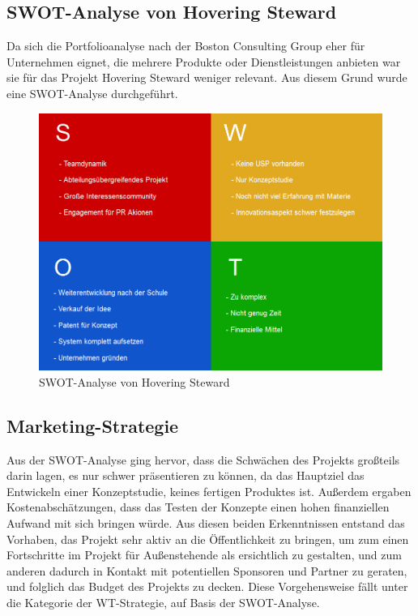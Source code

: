     \subsection*{SWOT-Analyse von Hovering Steward}
    Da sich die Portfolioanalyse nach der Boston Consulting Group eher für Unternehmen eignet, die mehrere Produkte oder Dienstleistungen anbieten war sie für das Projekt
    Hovering Steward weniger relevant. Aus diesem Grund wurde eine SWOT-Analyse durchgeführt.

    \begin{figure}[H]
      \begin{centering}
      \includegraphics[width = 1\textwidth]{Bilder/hovi_SWOT.png}
      \par\end{centering}
      \caption{SWOT-Analyse von Hovering Steward}
      \label{hoviswot}
    \end{figure}

  \subsection{Marketing-Strategie}
  Aus der SWOT-Analyse ging hervor, dass die Schwächen des Projekts großteils darin lagen, es nur schwer präsentieren zu können, da das Hauptziel das Entwickeln
  einer Konzeptstudie, keines fertigen Produktes ist. Außerdem ergaben Kostenabschätzungen, dass das Testen der Konzepte einen hohen finanziellen Aufwand mit sich bringen
  würde. Aus diesen beiden Erkenntnissen entstand das Vorhaben, das Projekt sehr aktiv an die Öffentlichkeit zu bringen, um zum einen Fortschritte im Projekt
  für Außenstehende als ersichtlich zu gestalten, und zum anderen dadurch in Kontakt mit potentiellen Sponsoren und Partner zu geraten, und folglich das Budget des Projekts
  zu decken. Diese Vorgehensweise fällt unter die Kategorie der WT-Strategie, auf Basis der SWOT-Analyse.

